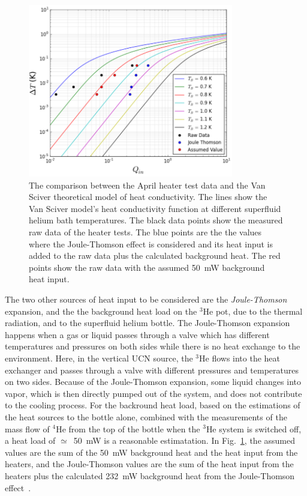 \begin{figure}[h!]
  \centering \includegraphics[width=0.8\textwidth]{April_Data.png}
  \caption{The comparison between the April heater test data and the
    Van Sciver theoretical model of heat conductivity. The lines show
    the Van Sciver model's heat conductivity function at different
    superfluid helium bath temperatures. The black data points show
    the measured raw data of the heater tests. The blue points are the
    the values where the Joule-Thomson effect is considered and its
    heat input is added to the raw data plus the calculated background
    heat. The red points show the raw data with the assumed 50~mW
    background heat input.}
\label{fig:April_Data}
\end{figure}


The two other sources of heat input to be considered are the
{\it{Joule-Thomson}} expansion, and the the background heat load on
the $^3$He pot, due to the thermal radiation, and to the superfluid
helium bottle. The Joule-Thomson expansion happens when a gas or
liquid passes through a valve which has different temperatures and
pressures on both sides while there is no heat exchange to the
environment. Here, in the vertical UCN source, the $^3$He flows into
the heat exchanger and passes through a valve with different pressures
and temperatures on two sides. Because of the Joule-Thomson expansion,
some liquid changes into vapor, which is then directly pumped out of
the system, and does not contribute to the cooling process.  For the
backround heat load, based on the estimations of the heat sources to
the bottle alone, combined with the measurements of the mass flow of
$^4$He from the top of the bottle when the $^3$He system is switched
off, a heat load of $\simeq$~50~mW is a reasonable estimatation. In
Fig.~\ref{fig:April_Data}, the assumed values are the sum of the 50~mW
background heat and the heat input from the heaters, and the
Joule-Thomson values are the sum of the heat input from the heaters
plus the calculated 232~mW background heat from the Joule-Thomson
effect~\cite{Florian_thesis}.



